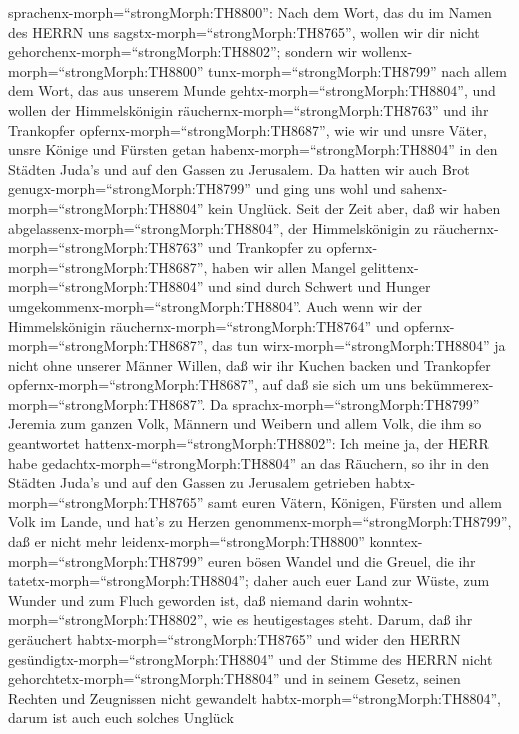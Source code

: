 sprachenx-morph=``strongMorph:TH8800'':  Nach dem Wort, das
du im Namen des HERRN uns sagstx-morph=``strongMorph:TH8765'', wollen
wir dir nicht gehorchenx-morph=``strongMorph:TH8802''; 
sondern wir wollenx-morph=``strongMorph:TH8800''
tunx-morph=``strongMorph:TH8799'' nach allem dem Wort, das aus unserem
Munde gehtx-morph=``strongMorph:TH8804'', und wollen der Himmelskönigin
räuchernx-morph=``strongMorph:TH8763'' und ihr Trankopfer
opfernx-morph=``strongMorph:TH8687'', wie wir und unsre Väter, unsre
Könige und Fürsten getan habenx-morph=``strongMorph:TH8804'' in den
Städten Juda's und auf den Gassen zu Jerusalem. Da hatten wir auch Brot
genugx-morph=``strongMorph:TH8799'' und ging uns wohl und
sahenx-morph=``strongMorph:TH8804'' kein Unglück.  Seit der
Zeit aber, daß wir haben abgelassenx-morph=``strongMorph:TH8804'', der
Himmelskönigin zu räuchernx-morph=``strongMorph:TH8763'' und Trankopfer
zu opfernx-morph=``strongMorph:TH8687'', haben wir allen Mangel
gelittenx-morph=``strongMorph:TH8804'' und sind durch Schwert und Hunger
umgekommenx-morph=``strongMorph:TH8804''.  Auch wenn wir
der Himmelskönigin räuchernx-morph=``strongMorph:TH8764'' und
opfernx-morph=``strongMorph:TH8687'', das tun
wirx-morph=``strongMorph:TH8804'' ja nicht ohne unserer Männer Willen,
daß wir ihr Kuchen backen und Trankopfer
opfernx-morph=``strongMorph:TH8687'', auf daß sie sich um uns
bekümmerex-morph=``strongMorph:TH8687''.  Da
sprachx-morph=``strongMorph:TH8799'' Jeremia zum ganzen Volk, Männern
und Weibern und allem Volk, die ihm so geantwortet
hattenx-morph=``strongMorph:TH8802'':  Ich meine ja, der
HERR habe gedachtx-morph=``strongMorph:TH8804'' an das Räuchern, so ihr
in den Städten Juda's und auf den Gassen zu Jerusalem getrieben
habtx-morph=``strongMorph:TH8765'' samt euren Vätern, Königen, Fürsten
und allem Volk im Lande, und hat's zu Herzen
genommenx-morph=``strongMorph:TH8799'',  daß er nicht mehr
leidenx-morph=``strongMorph:TH8800''
konntex-morph=``strongMorph:TH8799'' euren bösen Wandel und die Greuel,
die ihr tatetx-morph=``strongMorph:TH8804''; daher auch euer Land zur
Wüste, zum Wunder und zum Fluch geworden ist, daß niemand darin
wohntx-morph=``strongMorph:TH8802'', wie es heutigestages steht.
 Darum, daß ihr geräuchert
habtx-morph=``strongMorph:TH8765'' und wider den HERRN
gesündigtx-morph=``strongMorph:TH8804'' und der Stimme des HERRN nicht
gehorchtetx-morph=``strongMorph:TH8804'' und in seinem Gesetz, seinen
Rechten und Zeugnissen nicht gewandelt
habtx-morph=``strongMorph:TH8804'', darum ist auch euch solches Unglück
